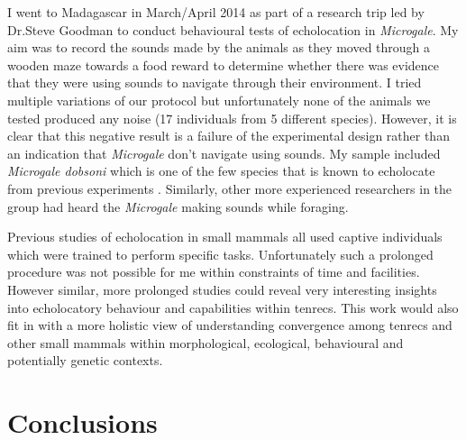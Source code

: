 	I went to Madagascar in March/April 2014 as part of a research trip led by Dr.Steve Goodman to conduct behavioural tests of echolocation in \textit{Microgale}. My aim was to record the sounds made by the animals as they moved through a wooden maze towards a food reward to determine whether there was evidence that they were using sounds to navigate through their environment. I tried multiple variations of our protocol but unfortunately none of the animals we tested produced any noise (17 individuals from 5 different species). However, it is clear that this negative result is a failure of the experimental design rather than an indication that \textit{Microgale} don't navigate using sounds. My sample included \textit{Microgale dobsoni} which is one of the few species that is known to echolocate from previous experiments \citep{Gould1965}. Similarly, other more experienced researchers in the group had heard the \textit{Microgale} making sounds while foraging. 
	
	Previous studies of echolocation in small mammals \citep{Gould1964, Gould1965, Tomasi1979, Siemers2009} all used captive individuals which were trained to perform specific tasks. Unfortunately such a prolonged procedure was not possible for me within constraints of time and facilities. However similar, more prolonged studies could reveal very interesting insights into echolocatory behaviour and capabilities within tenrecs. This work would also fit in with a more holistic view of understanding convergence among tenrecs and other small mammals within morphological, ecological, behavioural and potentially genetic contexts.



\section{Conclusions}



